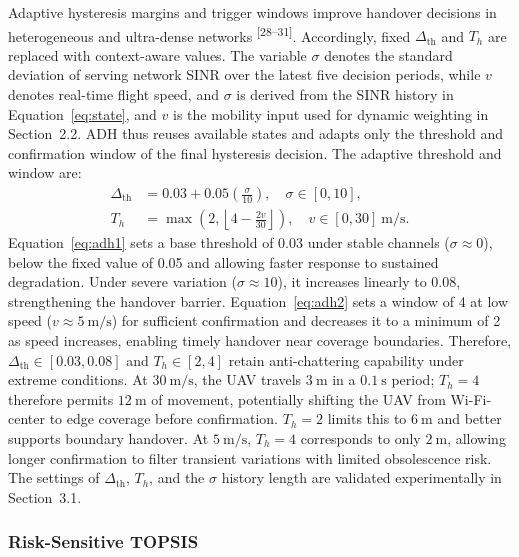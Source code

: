 \documentclass[10pt,a4paper]{article}
\newcommand{\upcite}[1]{\textsuperscript{[#1]}}
\begin{document}
Adaptive hysteresis margins and trigger windows improve handover decisions in heterogeneous and ultra-dense networks \upcite{28--31}. Accordingly, fixed $\Delta_{\mathrm{th}}$ and $T_h$ are replaced with context-aware values. The variable $\sigma$ denotes the standard deviation of serving network SINR over the latest five decision periods, while $v$ denotes real-time flight speed, and $\sigma$ is derived from the SINR history in Equation~\eqref{eq:state}, and $v$ is the mobility input used for dynamic weighting in Section~2.2. ADH thus reuses available states and adapts only the threshold and confirmation window of the final hysteresis decision. The adaptive threshold and window are:
\begin{align}
\Delta_{\mathrm{th}} &= 0.03+0.05\left(\frac{\sigma}{10}\right),\quad \sigma\in[0,10], \label{eq:adh1}\\
T_h &= \max\left(2,\left\lfloor4-\frac{2v}{30}\right\rfloor\right),\quad v\in[0,30]~\mathrm{m/s}. \label{eq:adh2}
\end{align}
Equation~\eqref{eq:adh1} sets a base threshold of 0.03 under stable channels ($\sigma\approx0$), below the fixed value of 0.05 and allowing faster response to sustained degradation. Under severe variation ($\sigma\approx10$), it increases linearly to 0.08, strengthening the handover barrier. Equation~\eqref{eq:adh2} sets a window of 4 at low speed ($v\approx5~\mathrm{m/s}$) for sufficient confirmation and decreases it to a minimum of 2 as speed increases, enabling timely handover near coverage boundaries. Therefore, $\Delta_{\mathrm{th}}\in[0.03,0.08]$ and $T_h\in[2,4]$ retain anti-chattering capability under extreme conditions. At $30~\mathrm{m/s}$, the UAV travels $3~\mathrm{m}$ in a $0.1~\mathrm{s}$ period; $T_h=4$ therefore permits $12~\mathrm{m}$ of movement, potentially shifting the UAV from Wi-Fi-center to edge coverage before confirmation. $T_h=2$ limits this to $6~\mathrm{m}$ and better supports boundary handover. At $5~\mathrm{m/s}$, $T_h=4$ corresponds to only $2~\mathrm{m}$, allowing longer confirmation to filter transient variations with limited obsolescence risk. The settings of $\Delta_{\mathrm{th}}$, $T_h$, and the $\sigma$ history length are validated experimentally in Section~3.1.

\subsubsection{Risk-Sensitive TOPSIS}
\end{document}
